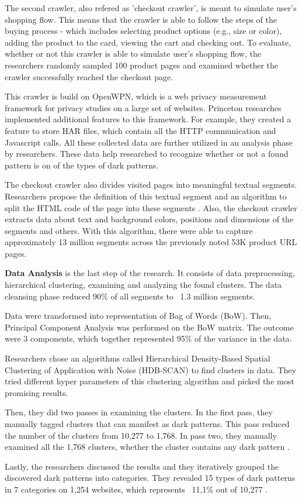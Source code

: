 The second crawler, also refered as 'checkout crawler', is meant to simulate user's shopping flow. This means that the crawler is able to follow the steps of the buying process - which includes selecting product options (e.g., size or color), adding the product to the card, viewing the cart and checking out. To evaluate, whether or not this crawler is able to simulate user's shopping flow, the researchers randomly sampled 100 product pages and examined whether the crawler successfully reached the checkout page.

This crawler is build on OpenWPN, which is a web privacy measurement framework for privacy studies on a large set of websites\cite{github-openwpm}. Princeton researches implemented additional features to this framework. For example, they created a feature to store HAR files, which contain all the HTTP communication and Javascript calls. All these collected data are further utilized in an analysis phase by researchers. These data help researched to recognize whether or not a found pattern is on of the types of dark patterns.

The checkout crawler also divides visited pages into meaningful textual segments. Researchers propose the definition of this textual segment and an algorithm to split the HTML code of the page into these segments \cite{dark-patterns-at-scale}. Also, the checkout crawler extracts data about text and background colors, positions and dimensions of the segments and others. With this algorithm, there were able to capture approximately 13 million segments across the previously noted 53K product URL pages.

\textbf{Data Analysis} is the last step of the research. It consists of data preprocessing, hierarchical clustering, examining and analyzing the found clusters. The data cleansing phase reduced 90\% of all segments to ~1.3 million segments.

Data were transformed into representation of Bag of Words (BoW)\cite{bag-of-words}. Then, Principal Component Analysis was performed on the BoW matrix. The outcome were 3 components, which together represented 95\% of the variance in the data. 

Researchers chose an algorithms called Hierarchical Density-Based Spatial Clustering of Application with Noise (HDB-SCAN)\cite{hdbscan} to find clusters in data. They tried different hyper parameters of this clustering algorithm and picked the most promising results.

Then, they did two passes in examining the clusters. In the first pass, they manually tagged clusters that can manifest as dark patterns. This pass reduced the number of the clusters from 10,277 to 1,768. In pass two, they manually examined all the 1,768 clusters, whether the cluster contains any dark pattern \cite{dark-patterns-at-scale}.

Lastly, the researchers discussed the results and they iteratively grouped the discovered dark patterns into categories. They revealed 15 types of dark patterns in 7 categories on 1,254 websites, which represents ~11,1\% out of 10,277 \cite{dark-patterns-at-scale}.




